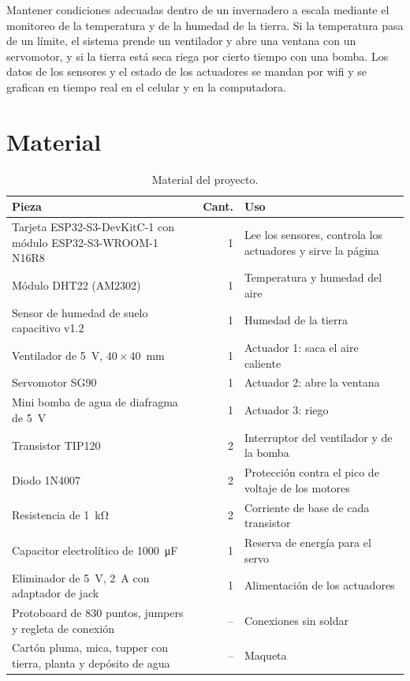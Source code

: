 \documentclass[12pt, letterpaper]{article}
\begin{document}
Mantener condiciones adecuadas dentro de un invernadero a escala mediante el monitoreo de la temperatura y de la
humedad de la tierra. Si la temperatura pasa de un límite, el sistema prende un ventilador y abre una ventana con un
servomotor, y si la tierra está seca riega por cierto tiempo con una bomba. Los datos de los sensores y el estado de
los actuadores se mandan por wifi y se grafican en tiempo real en el celular y en la computadora.

\section{Material}

\begin{table}[H]
\centering
\begin{tabularx}{\textwidth}{>{\raggedright\arraybackslash}p{}rX}
\toprule
\textbf{Pieza} & \textbf{Cant.} & \textbf{Uso} \\
\midrule
Tarjeta ESP32-S3-DevKitC-1 con módulo ESP32-S3-WROOM-1 N16R8 & 1 & Lee los sensores, controla los actuadores y sirve la página \\
Módulo DHT22 (AM2302) & 1 & Temperatura y humedad del aire \\
Sensor de humedad de suelo capacitivo v1.2 & 1 & Humedad de la tierra \\
Ventilador de \SI{5}{\volt}, $40 \times 40$~mm & 1 & Actuador 1: saca el aire caliente \\
Servomotor SG90 & 1 & Actuador 2: abre la ventana \\
Mini bomba de agua de diafragma de \SI{5}{\volt} & 1 & Actuador 3: riego \\
Transistor TIP120 & 2 & Interruptor del ventilador y de la bomba \\
Diodo 1N4007 & 2 & Protección contra el pico de voltaje de los motores \\
Resistencia de \SI{1}{\kilo\ohm} & 2 & Corriente de base de cada transistor \\
Capacitor electrolítico de \SI{1000}{\micro\farad} & 1 & Reserva de energía para el servo \\
Eliminador de \SI{5}{\volt}, \SI{2}{\ampere} con adaptador de jack & 1 & Alimentación de los actuadores \\
Protoboard de 830 puntos, jumpers y regleta de conexión & -- & Conexiones sin soldar \\
Cartón pluma, mica, tupper con tierra, planta y depósito de agua & -- & Maqueta \\
\bottomrule
\end{tabularx}
\caption{Material del proyecto.}
\end{table}
\end{document}
